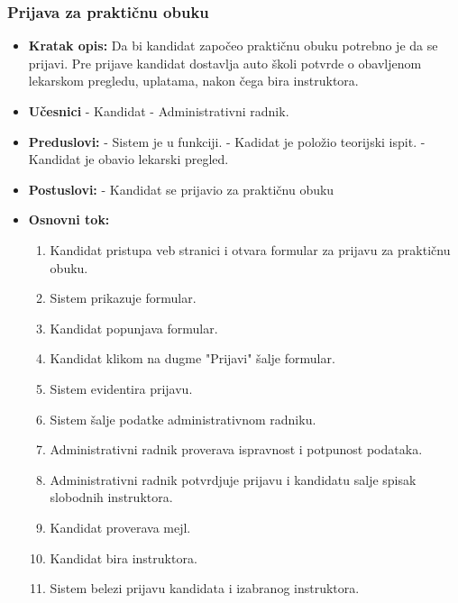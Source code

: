 \subsubsection{Prijava za praktičnu obuku}

\vspace{3mm}

\begin{itemize}

\item \textbf{Kratak opis:} Da bi kandidat započeo praktičnu obuku potrebno je da se prijavi. Pre prijave kandidat dostavlja auto školi potvrde o obavljenom lekarskom pregledu, uplatama, nakon čega bira instruktora.

\vspace{2mm}

\item \textbf{Učesnici} \newline
   - Kandidat \newline 
   - Administrativni radnik.

\item \textbf{Preduslovi:} \newline
   - Sistem je u funkciji. \newline
   - Kadidat je položio teorijski ispit. \newline 
   - Kandidat je obavio lekarski pregled. 

\item \textbf{Postuslovi:} \newline
    - Kandidat se prijavio za praktičnu obuku 

\item \textbf{Osnovni tok:}  
   \begin{enumerate}
   \item Kandidat pristupa veb stranici i otvara formular za prijavu za praktičnu obuku.
   \item Sistem prikazuje formular.
   \item Kandidat popunjava formular.
   \item Kandidat klikom na dugme "Prijavi" šalje formular.
   \item Sistem evidentira prijavu.
   \item Sistem šalje podatke administrativnom radniku.
   \item Administrativni radnik proverava ispravnost i potpunost podataka.
   \item Administrativni radnik potvrdjuje prijavu i kandidatu salje spisak slobodnih instruktora.
   \item Kandidat proverava mejl.
   \item Kandidat bira instruktora.
   \item Sistem belezi prijavu kandidata i izabranog instruktora.
   \end{enumerate}


\end{itemize}
